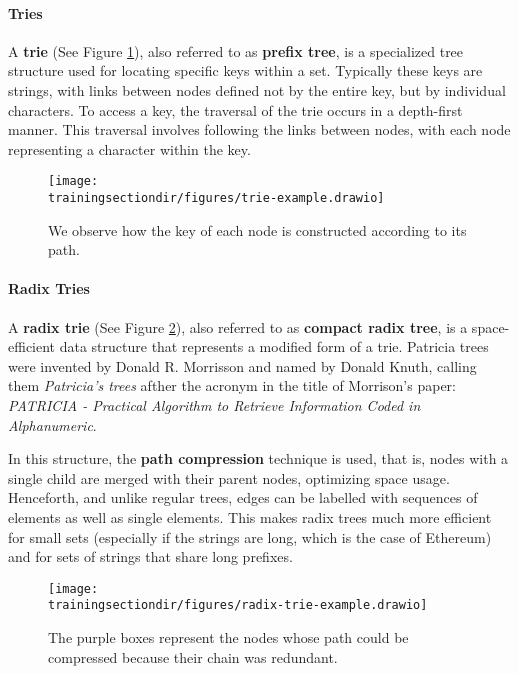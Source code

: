 \paragraph*{Tries}

A \textbf{trie} (See Figure \ref{fig:trie-example}), also referred to as \textbf{prefix tree}, is a specialized tree structure used for locating specific keys within a set. Typically these keys are strings, with links between nodes defined not by the entire key, but by individual characters. To access a key, the traversal of the trie occurs in a depth-first manner. This traversal involves following the links between nodes, with each node representing a character within the key.

\begin{figure}[h]
\centering
\texttt{[image: \\trainingsectiondir/figures/trie-example.drawio]}
\caption{We observe how the key of each node is constructed according to its path.}
\label{fig:trie-example}
\end{figure}

\paragraph*{Radix Tries}

A \textbf{radix trie} (See Figure \ref{fig:radix-trie-example}), also referred to as \textbf{compact radix tree}, is a space-efficient data structure that represents a modified form of a trie. Patricia trees were invented by Donald R. Morrisson and named by Donald Knuth, calling them \textit{Patricia's trees} afther the acronym in the title of Morrison's paper: \textit{PATRICIA - Practical Algorithm to Retrieve Information Coded in Alphanumeric}.

In this structure, the \textbf{path compression} technique is used, that is, nodes with a single child are merged with their parent nodes, optimizing space usage. Henceforth, and unlike regular trees, edges can be labelled with sequences of elements as well as single elements. This makes radix trees much more efficient for small sets (especially if the strings are long, which is the case of Ethereum) and for sets of strings that share long prefixes.

\begin{figure}[h]
\centering
\texttt{[image: \\trainingsectiondir/figures/radix-trie-example.drawio]}
\caption{The purple boxes represent the nodes whose path could be compressed because their chain was redundant.
}
\label{fig:radix-trie-example}
\end{figure}


